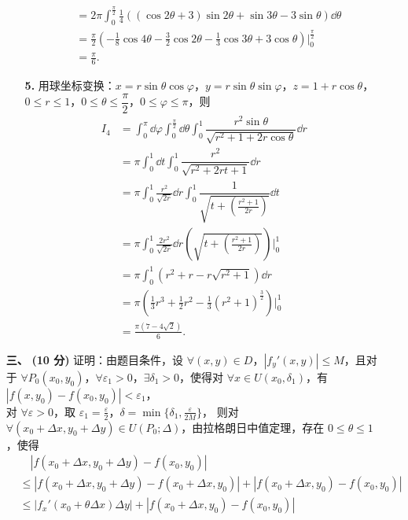 \documentclass{ctexart}
\begin{document}
\begin{enumerate}
\begin{enumerate}
\begin{align*}
        &=2\pi\int_0^{\frac{\pi}{2}}\frac{1}{4}((\cos 2\theta+3)\sin 2\theta+\sin 3\theta-3\sin\theta)\dd{\theta} \\
        &=\frac{\pi}{2}(-\frac{1}{8}\cos 4\theta-\frac{3}{2}\cos 2\theta-\frac{1}{3}\cos 3\theta+3\cos\theta)\vert_{0}^{\frac{\pi}{2}} \\
        &=\frac{\pi}{6}.
        \end{align*}
        \item[\textbf{5.}] 用球坐标变换：$x=r\sin\theta\cos\varphi$，$y=r\sin\theta\sin\varphi$，$z=1+r\cos\theta$，$0\le r\le 1$，$0\le\theta\le\dfrac{\pi}{2}$，$0\le\varphi\le\pi$，则
        \begin{align*}
        I_4&=\int_0^{\pi}\dd{\varphi}\int_0^{\frac{\pi}{2}}\dd{\theta}\int_0^1\dfrac{r^2\sin\theta}{\sqrt{r^2+1+2r\cos\theta}}\dd{r} \\
        &=\pi\int_0^1\dd{t}\int_0^1\dfrac{r^2}{\sqrt{r^2+2rt+1}}\dd{r} \\
        &=\pi\int_0^1\frac{r^2}{\sqrt{2r}}\dd{r}\int_0^1\dfrac{1}{\sqrt{t+(\frac{r^2+1}{2r})}}\dd{t} \\
        &=\pi\int_0^1\frac{2r^2}{\sqrt{2r}}\dd{r}(\sqrt{t+(\frac{r^2+1}{2r})})\vert_0^1 \\
        &=\pi\int_0^1(r^2+r-r\sqrt{r^2+1})\dd{r} \\
        &=\pi(\frac{1}{3}r^3+\frac{1}{2}r^2-\frac{1}{3}(r^2+1)^{\frac{3}{2}})\vert_0^1 \\
        &=\frac{\pi(7-4\sqrt{2})}{6}.
        \end{align*}
    \end{enumerate}
    \item[\textbf{三、}] \textbf{(10 分)} 证明：由题目条件，设 $\forall (x,y)\in D$，$|f_y'(x,y)|\le M$，且对于 $\forall P_0(x_0,y_0)$，$\forall\varepsilon_1>0$，$\exists\delta_1>0$，使得对 $\forall x\in U(x_0,\delta_1)$，有 $|f(x,y_0)-f(x_0,y_0)|<\varepsilon_1$， \\
    对 $\forall\varepsilon>0$，取 $\varepsilon_1=\frac{\varepsilon}{2}$，$\delta=\min\{\delta_1,\frac{\varepsilon}{2M}\}$，
    则对 $\forall (x_0+\Delta x, y_0+\Delta y)\in U(P_0;\Delta)$，由拉格朗日中值定理，存在 $0\le\theta\le 1$，使得
    \begin{align*}
    &\quad|f(x_0+\Delta x,y_0+\Delta y)-f(x_0,y_0)| \\
    &\le |f(x_0+\Delta x,y_0+\Delta y)-f(x_0+\Delta x,y_0)|+|f(x_0+\Delta x,y_0)-f(x_0,y_0)| \\
    &\le |f_x'(x_0+\theta\Delta x)\Delta y|+|f(x_0+\Delta x,y_0)-f(x_0,y_0)| \\

\end{align*}
\end{enumerate}
\end{document}
